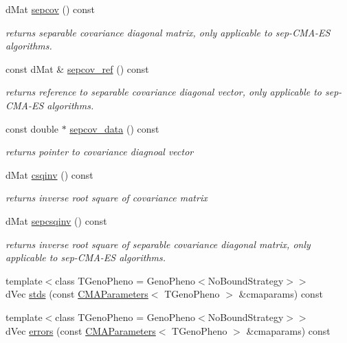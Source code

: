 \begin{DoxyCompactItemize}
d\+Mat \hyperlink{classlibcmaes_1_1CMASolutions_ab79973d3d76c8ffb810608252ba72df9}{sepcov} () const 
\begin{DoxyCompactList}\small\item\em returns separable covariance diagonal matrix, only applicable to sep-\/\+C\+M\+A-\/\+E\+S algorithms. \end{DoxyCompactList}\item 
const d\+Mat \& \hyperlink{classlibcmaes_1_1CMASolutions_a21617b6ff54abd57a1b18667d8eb1724}{sepcov\+\_\+ref} () const 
\begin{DoxyCompactList}\small\item\em returns reference to separable covariance diagonal vector, only applicable to sep-\/\+C\+M\+A-\/\+E\+S algorithms. \end{DoxyCompactList}\item 
const double $\ast$ \hyperlink{classlibcmaes_1_1CMASolutions_a66c5167b418f84fbdfc91735bf573bdb}{sepcov\+\_\+data} () const 
\begin{DoxyCompactList}\small\item\em returns pointer to covariance diagnoal vector \end{DoxyCompactList}\item 
d\+Mat \hyperlink{classlibcmaes_1_1CMASolutions_a702e38431816384b0378e7b9b198e3f3}{csqinv} () const 
\begin{DoxyCompactList}\small\item\em returns inverse root square of covariance matrix \end{DoxyCompactList}\item 
d\+Mat \hyperlink{classlibcmaes_1_1CMASolutions_afc21a4719c268edd6a67a28c5a7f16ff}{sepcsqinv} () const 
\begin{DoxyCompactList}\small\item\em returns inverse root square of separable covariance diagonal matrix, only applicable to sep-\/\+C\+M\+A-\/\+E\+S algorithms. \end{DoxyCompactList}\item 
{\footnotesize template$<$class T\+Geno\+Pheno  = Geno\+Pheno$<$\+No\+Bound\+Strategy$>$$>$ }\\d\+Vec \hyperlink{classlibcmaes_1_1CMASolutions_ab58ddcaab8e1a939325911ba405b65ed}{stds} (const \hyperlink{classlibcmaes_1_1CMAParameters}{C\+M\+A\+Parameters}$<$ T\+Geno\+Pheno $>$ \&cmaparams) const 
\item 
{\footnotesize template$<$class T\+Geno\+Pheno  = Geno\+Pheno$<$\+No\+Bound\+Strategy$>$$>$ }\\d\+Vec \hyperlink{classlibcmaes_1_1CMASolutions_aedf6c2701e16bf4fe8fc5fe9f2747880}{errors} (const \hyperlink{classlibcmaes_1_1CMAParameters}{C\+M\+A\+Parameters}$<$ T\+Geno\+Pheno $>$ \&cmaparams) const 

\end{DoxyCompactItemize}
